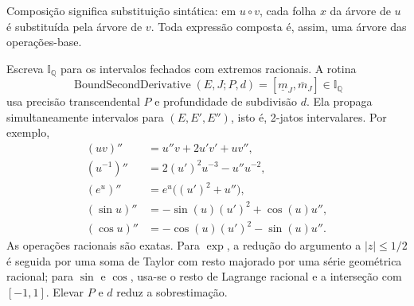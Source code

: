 \documentclass[11pt,a4paper]{article}
\theoremstyle{preciso}
\theoremstyle{definition}
\newcommand{\Q}{\mathbb Q}
\newcommand{\eqn}[2]{\begin{equation}\label{eq:#1}#2\end{equation}}
\begin{document}
Composição significa substituição sintática: em $u\circ v$, cada folha $x$ da árvore de $u$ é substituída pela árvore de $v$. Toda expressão composta é, assim, uma árvore das operações-base.

Escreva $\mathbb I_{\Q}$ para os intervalos fechados com extremos racionais. A rotina
\eqn{36}{\operatorname{BoundSecondDerivative}(E,J;P,d)
=[\underline m_J,\overline m_J]\in\mathbb I_{\Q}}
usa precisão transcendental $P$ e profundidade de subdivisão $d$. Ela propaga simultaneamente intervalos para $(E,E',E'')$, isto é, 2-jatos intervalares. Por exemplo,
\begin{align*}
(uv)''&=u''v+2u'v'+uv'',\\
(u^{-1})''&=2(u')^2u^{-3}-u''u^{-2},\\
(e^u)''&=e^u\bigl((u')^2+u''\bigr),\\
(\sin u)''&=-\sin(u)(u')^2+\cos(u)u'',\\
(\cos u)''&=-\cos(u)(u')^2-\sin(u)u''.
\end{align*}
As operações racionais são exatas. Para $\exp$, a redução do argumento a $|z|\le1/2$ é seguida por uma soma de Taylor com resto majorado por uma série geométrica racional; para $\sin$ e $\cos$, usa-se o resto de Lagrange racional e a interseção com $[-1,1]$. Elevar $P$ e $d$ reduz a sobrestimação.
\end{document}
